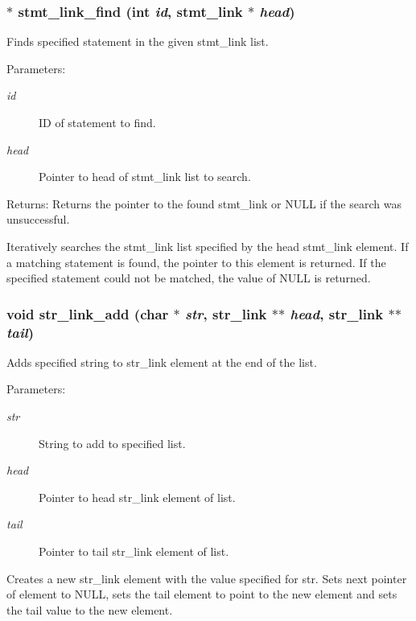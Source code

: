 \subsubsection{$\ast$ stmt\_\-link\_\-find (int {\em id}, {\bf stmt\_\-link} $\ast$ {\em head})}\label{link_8h_a12}


Finds specified statement in the given stmt\_\-link list. 

\begin{Desc}
\item[Parameters:]
\begin{description}
\item[{\em id}]ID of statement to find. \item[{\em head}]Pointer to head of stmt\_\-link list to search.\end{description}
\end{Desc}
\begin{Desc}
\item[Returns:]Returns the pointer to the found stmt\_\-link or NULL if the search was unsuccessful.\end{Desc}
Iteratively searches the stmt\_\-link list specified by the head stmt\_\-link element. If a matching statement is found, the pointer to this element is returned. If the specified statement could not be matched, the value of NULL is returned. 
\subsubsection{\setlength{\rightskip}{0pt plus 5cm}void str\_\-link\_\-add (char $\ast$ {\em str}, {\bf str\_\-link} $\ast$$\ast$ {\em head}, {\bf str\_\-link} $\ast$$\ast$ {\em tail})}\label{link_8h_a0}


Adds specified string to str\_\-link element at the end of the list. 

\begin{Desc}
\item[Parameters:]
\begin{description}
\item[{\em str}]String to add to specified list. \item[{\em head}]Pointer to head str\_\-link element of list. \item[{\em tail}]Pointer to tail str\_\-link element of list.\end{description}
\end{Desc}
Creates a new str\_\-link element with the value specified for str. Sets next pointer of element to NULL, sets the tail element to point to the new element and sets the tail value to the new element. 
